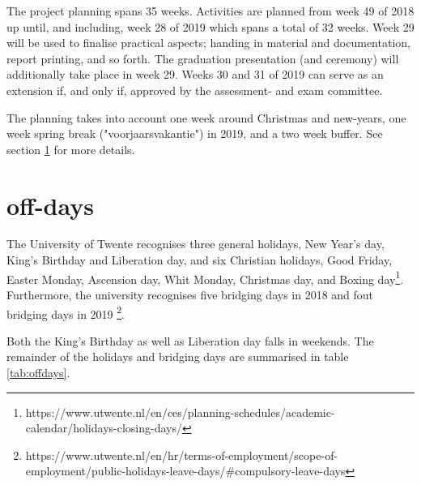 The project planning spans 35 weeks. Activities are planned from week 49 of 2018 up until, and including, week 28 of 2019 which spans a total of 32 weeks. Week 29 will be used to finalise practical aspects; handing in material and documentation, report printing, and so forth. The graduation presentation (and ceremony) will additionally take place in week 29. Weeks 30 and 31 of 2019 can serve as an extension if, and only if, approved by the assessment- and exam committee.

The planning takes into account one week around Christmas and new-years, one week spring break ("voorjaarsvakantie") in 2019, and a two week buffer. See section \ref{sec:off-days} for more details.
\newpage
\section{off-days} \label{sec:off-days}
The University of Twente recognises three general holidays, New Year's day, King's Birthday and Liberation day, and six Christian holidays, Good Friday, Easter Monday, Ascension day, Whit Monday, Christmas day, and Boxing day\footnote{\label{fn:web_holi} https://www.utwente.nl/en/ces/planning-schedules/academic-calendar/holidays-closing-days/}. Furthermore, the university recognises five bridging days in 2018 and fout bridging days in 2019 \footnote{\label{fn:col_clos} \raggedright https://www.utwente.nl/en/hr/terms-of-employment/scope-of-employment/public-holidays-leave-days/\#compulsory-leave-days}. 

Both the King's Birthday as well as Liberation day falls in weekends. The remainder of the holidays and bridging days are summarised in table \ref{tab:offdays}.

